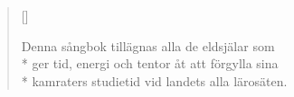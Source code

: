 
\settowidth{\versewidth}{Bakom brödbutiken bodde Baskerbosses båda bröder,}


\begin{verse}[\versewidth]


Denna sångbok tillägnas alla de eldsjälar som\\*
ger tid, energi och tentor åt att förgylla sina\\*
kamraters studietid vid landets alla lärosäten.\\




\end{verse}

